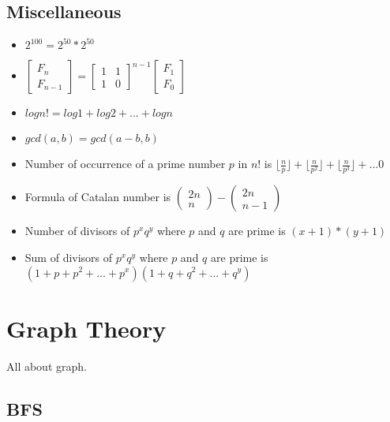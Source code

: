 \documentclass[10pt, a4paper]{article}
\begin{document}
\begin{multicols}{2}
\subsection{Miscellaneous}
\begin{itemize}
	\item \(2^{100} = 2^{50} * 2^{50}\)
	\item \( 
        \begin{bmatrix}
            F_n\\
            F_{n-1}
        \end{bmatrix} = 
        \begin{bmatrix}
            1 & 1\\
            1 & 0
        \end{bmatrix} ^ {n-1}
        \begin{bmatrix}
            F_1\\
            F_0
        \end{bmatrix}
    \)
    \item \(
        logn! = log1 +log2+...+logn
    \)
    \item \(
    	gcd(a, b) = gcd(a-b, b)
    \)
    \item Number of occurrence of a prime number $p$ in $n!$ is \(
    	\lfloor \frac{n}{p} \rfloor +	
    	\lfloor \frac{n}{p^2} \rfloor + 
    	\lfloor \frac{n}{p^3} \rfloor + ... 0
    \)
    \item Formula of Catalan number is \(
    	\begin{pmatrix}
    		2n\\
    		n
    	\end{pmatrix}
    	 -
    	\begin{pmatrix}
    		2n\\
    		n - 1
    	\end{pmatrix}
    \)
    \item Number of divisors of $p^xq^y$ where $p$ and $q$ are prime is \(
    	(x + 1) * (y + 1)
    \)
    \item Sum of divisors of $p^xq^y$ where $p$ and $q$ are prime is \(
    	(1 + p + p^2 + ... + p^x) (1 + q + q^2 + ... + q^y)
    \)
\end{itemize}

\section{Graph Theory}
All about graph.

\subsection{BFS}



\end{multicols}
\end{document}
